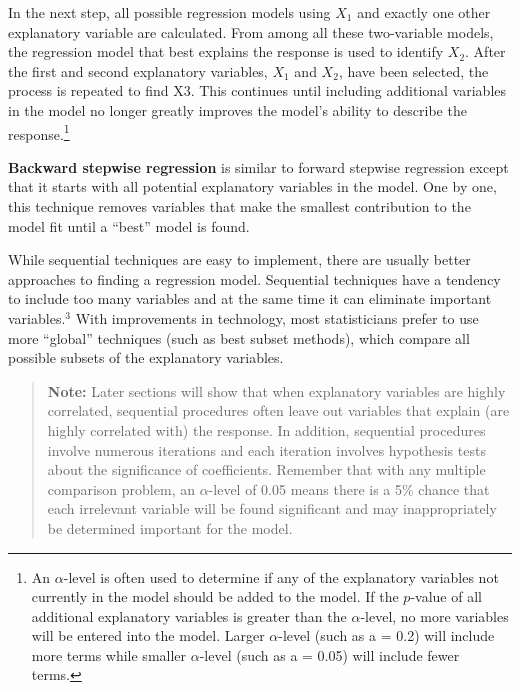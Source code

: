 \documentclass[
]{report}
\begin{document}
In the next step, all possible regression models using \(\scriptstyle X_1\) and exactly one other explanatory variable are calculated. From among all these two-variable models, the regression model that best explains the response is used to identify \(\scriptstyle X_2\). After the first and second explanatory variables, \(\scriptstyle X_1\) and \(\scriptstyle X_2\), have been selected, the process is repeated to find X3. This continues until including additional variables in the model no longer
greatly improves the model's ability to describe the response.\footnote{An \(\scriptstyle \alpha\)-level is often used to determine if any of the explanatory variables not currently in the model should be added to the model. If the \(\scriptstyle p\)-value of all additional explanatory variables is greater than the \(\scriptstyle \alpha\)-level, no more variables will be entered into the model. Larger \(\scriptstyle \alpha\)-level (such as a = 0.2) will include more terms while smaller \(\scriptstyle \alpha\)-level (such as a = 0.05) will include fewer terms.}

\textbf{Backward stepwise regression} is similar to forward stepwise regression except that it starts with all potential explanatory variables in the model. One by one, this technique removes variables that make the smallest contribution to the model fit until a ``best'' model is found.

While sequential techniques are easy to implement, there are usually better approaches to finding a regression model. Sequential techniques have a tendency to include too many variables and at the same time it can eliminate important variables.\(^3\) With improvements in technology, most statisticians prefer to use more ``global'' techniques (such as best subset methods), which compare all possible subsets of the explanatory variables.

\begin{quote}
\textbf{Note:} Later sections will show that when explanatory variables are highly correlated, sequential procedures often leave out variables that explain (are highly correlated with) the response. In addition, sequential procedures involve numerous iterations and each iteration involves hypothesis tests about the significance of coefficients. Remember that with any multiple comparison problem, an \(\scriptstyle \alpha\)-level of 0.05 means there is a 5\% chance that each irrelevant variable will be found significant and may inappropriately be determined important for the model.
\end{quote}
\end{document}
